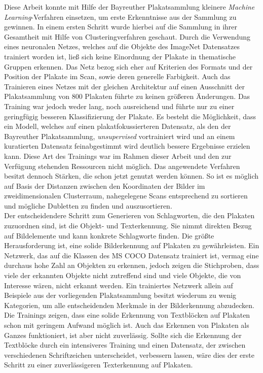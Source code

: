 \documentclass[a4paper,12pt,ngerman]{article}
\begin{document}
Diese Arbeit konnte mit Hilfe der Bayreuther Plakatsammlung kleinere \textit{Machine Learning}-Verfahren einsetzen, um erste Erkenntnisse aus der Sammlung zu gewinnen. In einem ersten Schritt wurde hierbei auf die Sammlung in ihrer Gesamtheit mit Hilfe von Clusteringverfahren geschaut. Durch die Verwendung eines neuronalen Netzes, welches auf die Objekte des ImageNet Datensatzes trainiert worden ist, ließ sich keine Einordnung der Plakate in thematische Gruppen erkennen. Das Netz bezog sich eher auf Kriterien des Formats und der Position der Plakate im Scan, sowie deren generelle Farbigkeit. Auch das Trainieren eines Netzes mit der gleichen Architektur auf einen Ausschnitt der Plakatsammlung von 800 Plakaten führte zu keinen größeren Änderungen. Das Training war jedoch weder lang, noch ausreichend und führte nur zu einer geringfügig besseren Klassifizierung der Plakate. Es besteht die Möglichkeit, dass ein Modell, welches auf einen plakatfokussierteren Datensatz, als den der Bayreuther Plakatsammlung, \textit{unsupervised} vortrainiert wird und an einem kuratierten Datensatz feinabgestimmt wird deutlich bessere Ergebnisse erzielen kann. Diese Art des Trainings war im Rahmen dieser Arbeit und den zur Verfügung stehenden Ressourcen nicht möglich. Das angewendete Verfahren besitzt dennoch Stärken, die schon jetzt genutzt werden können. So ist es möglich auf Basis der Distanzen zwischen den Koordinaten der Bilder im zweidimensionalen Clusterraum, nahegelegene Scans entsprechend zu sortieren und mögliche Dubletten zu finden und auszusortieren. \\
Der entscheidendere Schritt zum Generieren von Schlagworten, die den Plakaten zuzuordnen sind, ist die Objekt- und Texterkennung. Sie nimmt direkten Bezug auf Bildelemente und kann konkrete Schlagworte finden. Die größte Herausforderung ist, eine solide Bilderkennung auf Plakaten zu gewährleisten. Ein Netzwerk, das auf die Klassen des MS COCO Datensatz trainiert ist, vermag eine durchaus hohe Zahl an Objekten zu erkennen, jedoch zeigen die Stichproben, dass viele der erkannten Objekte nicht zutreffend sind und viele Objekte, die von Interesse wären, nicht erkannt werden. Ein trainiertes Netzwerk allein auf Beispiele aus der vorliegenden Plakatsammlung besitzt wiederum zu wenig Kategorien, um alle entscheidenden Merkmale in der Bilderkennung abzudecken. Die Trainings zeigen, dass eine solide Erkennung von Textblöcken auf Plakaten schon mit geringem Aufwand möglich ist. Auch das Erkennen von Plakaten als Ganzes funktioniert, ist aber nicht zuverlässig. Sollte sich die Erkennung der Textblöcke durch ein intensiveres Training und einen Datensatz, der zwischen verschiedenen Schriftzeichen unterscheidet, verbessern lassen, wäre dies der erste Schritt zu einer zuverlässigeren Texterkennung auf Plakaten. \\
\end{document}
